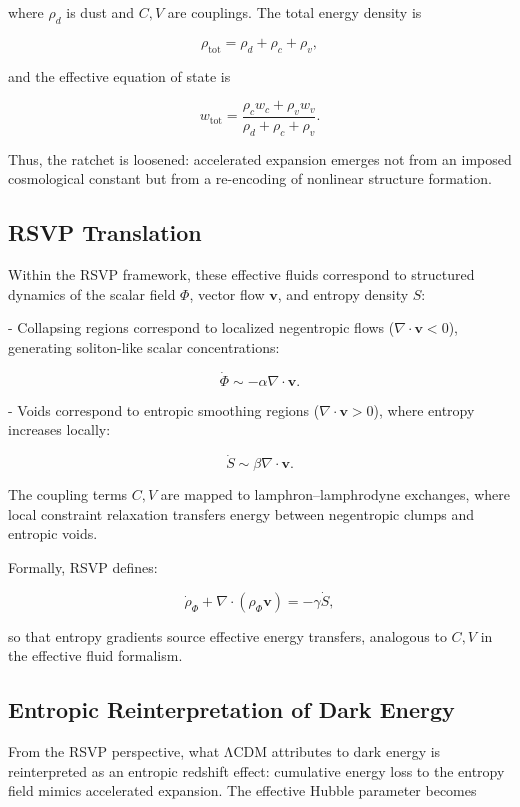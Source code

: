 \documentclass[12pt]{book}
\begin{document}
where \( \rho_d \) is dust and \( C, V \) are couplings. The total energy density is

\[ \rho_{\text{tot}} = \rho_d + \rho_c + \rho_v, \]

and the effective equation of state is

\[ w_{\text{tot}} = \frac{\rho_c w_c + \rho_v w_v}{\rho_d + \rho_c + \rho_v}. \tag{6.4} \]

Thus, the ratchet is loosened: accelerated expansion emerges not from an imposed cosmological constant but from a re-encoding of nonlinear structure formation.

\subsection{RSVP Translation}
Within the RSVP framework, these effective fluids correspond to structured dynamics of the scalar field \( \Phi \), vector flow \( \mathbf{v} \), and entropy density \( S \):

- Collapsing regions correspond to localized negentropic flows (\( \nabla \cdot \mathbf{v} < 0 \)), generating soliton-like scalar concentrations:

\[ \dot{\Phi} \sim -\alpha \nabla \cdot \mathbf{v}. \]

- Voids correspond to entropic smoothing regions (\( \nabla \cdot \mathbf{v} > 0 \)), where entropy increases locally:

\[ \dot{S} \sim \beta \nabla \cdot \mathbf{v}. \]

The coupling terms \( C, V \) are mapped to lamphron–lamphrodyne exchanges, where local constraint relaxation transfers energy between negentropic clumps and entropic voids.

Formally, RSVP defines:

\[ \dot{\rho}_\Phi + \nabla \cdot (\rho_\Phi \mathbf{v}) = -\gamma \dot{S}, \tag{6.5} \]

so that entropy gradients source effective energy transfers, analogous to \( C, V \) in the effective fluid formalism.

\subsection{Entropic Reinterpretation of Dark Energy}
From the RSVP perspective, what ΛCDM attributes to dark energy is reinterpreted as an entropic redshift effect: cumulative energy loss to the entropy field mimics accelerated expansion. The effective Hubble parameter becomes
\end{document}

